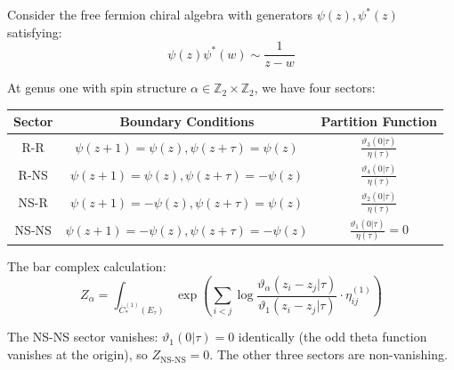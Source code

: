 \begin{example}
Consider the free fermion chiral algebra with generators $\psi(z), \psi^*(z)$ satisfying:
\[\psi(z)\psi^*(w) \sim \frac{1}{z-w}\]

At genus one with spin structure $\alpha \in \mathbb{Z}_2 \times \mathbb{Z}_2$, we have four sectors:

\begin{center}
\begin{tabular}{|c|c|c|}
\hline
Sector & Boundary Conditions & Partition Function \\
\hline
R-R & $\psi(z+1) = \psi(z), \psi(z+\tau) = \psi(z)$ & $\frac{\vartheta_3(0|\tau)}{\eta(\tau)}$ \\
R-NS & $\psi(z+1) = \psi(z), \psi(z+\tau) = -\psi(z)$ & $\frac{\vartheta_4(0|\tau)}{\eta(\tau)}$ \\
NS-R & $\psi(z+1) = -\psi(z), \psi(z+\tau) = \psi(z)$ & $\frac{\vartheta_2(0|\tau)}{\eta(\tau)}$ \\
NS-NS & $\psi(z+1) = -\psi(z), \psi(z+\tau) = -\psi(z)$ & $\frac{\vartheta_1(0|\tau)}{\eta(\tau)} = 0$ \\
\hline
\end{tabular}
\end{center}

The bar complex calculation:
\[Z_\alpha = \int_{\overline{C}_*^{(1)}(E_\tau)} \exp\left(\sum_{i<j} \log\frac{\vartheta_\alpha(z_i - z_j|\tau)}{\vartheta_1(z_i - z_j|\tau)} \cdot \eta_{ij}^{(1)}\right)\]

The NS-NS sector vanishes: $\vartheta_1(0|\tau) = 0$ identically (the odd theta function vanishes at the origin), so $Z_{\mathrm{NS\text{-}NS}} = 0$.  The other three sectors are non-vanishing.
\end{example}

